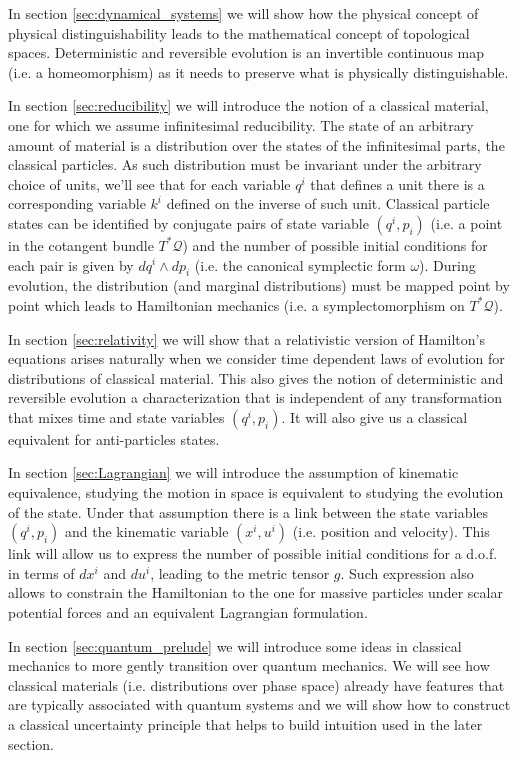 \documentclass[aps,pra,10pt,twocolumn,floatfix,nofootinbib]{revtex4-1}
\numberwithin{equation}{section}
\theoremstyle{definition}
\begin{document}
In section \ref{sec:dynamical_systems} we will show how the physical concept of physical distinguishability leads to the mathematical concept of topological spaces. Deterministic and reversible evolution is an invertible continuous map (i.e. a homeomorphism) as it needs to preserve what is physically distinguishable.

In section \ref{sec:reducibility} we will introduce the notion of a classical material, one for which we assume infinitesimal reducibility. The state of an arbitrary amount of material is a distribution over the states of the infinitesimal parts, the classical particles. As such distribution must be invariant under the arbitrary choice of units, we'll see that for each variable $q^i$ that defines a unit there is a corresponding variable $k^i$ defined on the inverse of such unit. Classical particle states can be identified by conjugate pairs of state variable $(q^i, p_i)$ (i.e. a point in the cotangent bundle $T^*\mathcal{Q}$) and the number of possible initial conditions for each pair is given by $dq^i \wedge dp_i$ (i.e. the canonical symplectic form $\omega$). During evolution, the distribution (and marginal distributions) must be mapped point by point which leads to Hamiltonian mechanics (i.e. a symplectomorphism on $T^*\mathcal{Q}$).

In section \ref{sec:relativity} we will show that a relativistic version of Hamilton's equations arises naturally when we consider time dependent laws of evolution for distributions of classical material. This also gives the notion of deterministic and reversible evolution a characterization that is independent of any transformation that mixes time and state variables $(q^i, p_i)$. It will also give us a classical equivalent for anti-particles states.

In section \ref{sec:Lagrangian} we will introduce the assumption of kinematic equivalence, studying the motion in space is equivalent to studying the evolution of the state. Under that assumption there is a link between the state variables $(q^i, p_i)$ and the kinematic variable $(x^i, u^i)$ (i.e. position and velocity). This link will allow us to express the number of possible initial conditions for a d.o.f. in terms of $dx^i$ and $du^i$, leading to the metric tensor $g$. Such expression also allows to constrain the Hamiltonian to the one for massive particles under scalar potential forces and an equivalent Lagrangian formulation.

In section \ref{sec:quantum_prelude} we will introduce some ideas in classical mechanics to more gently transition over quantum mechanics. We will see how classical materials (i.e. distributions over phase space) already have features that are typically associated with quantum systems and we will show how to construct a classical uncertainty principle that helps to build intuition used in the later section.
\end{document}
